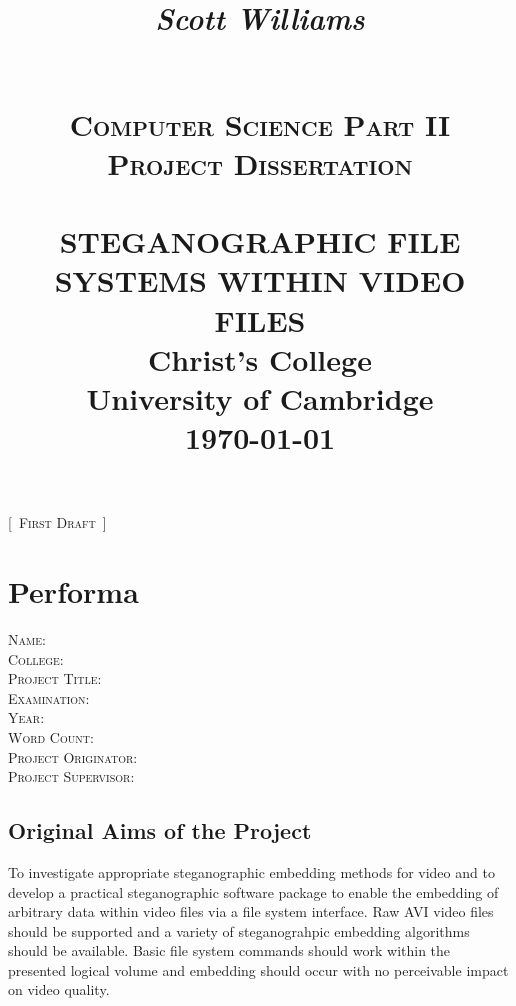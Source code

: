 \documentclass[paper=a4, fontsize=11pt,twoside]{scrartcl}    %
\title{
	\begin{flushright}
		\LARGE{\textit{Scott Williams}}
	\end{flushright}
	~\\[2.0cm]			
	\normalsize \textsc{Computer Science Part II Project Dissertation}\\[2.0cm]     %
    \HRule{0.5pt} \\                        %
    \LARGE \textbf{\uppercase{Steganographic file systems within video files}}    %
    \HRule{2pt} \\[30pt]        %
    \normalsize Christ's College\\[5pt]University of Cambridge\\[25pt]           
    \normalsize \today            %
}
\makeatletter
\numberwithin{table}{section}
\numberwithin{figure}{section}
\numberwithin{algorithm}{section}
\def\printtitle{%
    {\centering \@title\par}}
\def\printauthor{%
    {\large \@author}}
\newcommand\blankpage{%
    \null
    \thispagestyle{empty}%
    \addtocounter{page}{-1}%
    \newpage}
\makeatother
\begin{document}
\renewcommand{\thelstlisting}{\thesection.\arabic{lstlisting}}
\thispagestyle{empty}        %

\printtitle                    %
\vfill
\printauthor                %
\begin{center}
\huge{[~}\normalsize \textsc{First Draft}\huge{~]}
\end{center}
\afterpage{\blankpage}
\newpage
\setcounter{page}{1}        %
\section*{Performa}
\textsc{Name}: \\
\textsc{College}: \\
\textsc{Project Title}: \\
\textsc{Examination}: \\
\textsc{Year}: \\
\textsc{Word Count}: \\
\textsc{Project Originator}: \\
\textsc{Project Supervisor}: \\

\subsection*{Original Aims of the Project}
To investigate appropriate steganographic embedding methods for video and to develop a practical steganographic software package to enable the embedding of arbitrary data within video files via a file system interface. Raw AVI video files should be supported and a variety of steganograhpic embedding algorithms should be available. Basic file system commands should work within the presented logical volume and embedding should occur with no perceivable impact on video quality.
\end{document}
